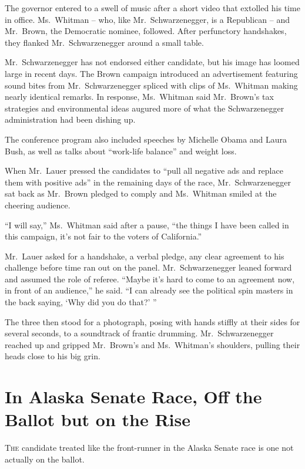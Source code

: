 ﻿\documentclass[12pt]{article}
\begin{document}
The governor entered to a swell of music after a short video that extolled his time in office.
Ms.~Whitman -- who, like Mr.~Schwarzenegger, is a Republican -- and Mr.~Brown, the Democratic
nominee, followed. After perfunctory handshakes, they flanked Mr.~Schwarzenegger around a small
table.

Mr.~Schwarzenegger has not endorsed either candidate, but his image has loomed large in recent days.
The Brown campaign introduced an advertisement featuring sound bites from Mr.~Schwarzenegger spliced
with clips of Ms.~Whitman making nearly identical remarks. In response, Ms.~Whitman said Mr.~Brown's
tax strategies and environmental ideas augured more of what the Schwarzenegger administration had
been dishing up.

The conference program also included speeches by Michelle Obama and Laura Bush, as well as talks
about ``work-life balance'' and weight loss.

When Mr.~Lauer pressed the candidates to ``pull all negative ads and replace them with positive
ads'' in the remaining days of the race, Mr.~Schwarzenegger sat back as Mr.~Brown pledged to comply
and Ms.~Whitman smiled at the cheering audience.

``I will say,'' Ms.~Whitman said after a pause, ``the things I have been called in this campaign,
it's not fair to the voters of California.''

Mr.~Lauer asked for a handshake, a verbal pledge, any clear agreement to his challenge before time
ran out on the panel. Mr.~Schwarzenegger leaned forward and assumed the role of referee. ``Maybe
it's hard to come to an agreement now, in front of an audience,'' he said. ``I can already see the
political spin masters in the back saying, `Why did you do that?' ''

The three then stood for a photograph, posing with hands stiffly at their sides for several seconds,
to a soundtrack of frantic drumming. Mr.~Schwarzenegger reached up and gripped Mr.~Brown's and
Ms.~Whitman's shoulders, pulling their heads close to his big grin.

\section{In Alaska Senate Race, Off the Ballot but on the Rise}

\lettrine{T}{he} candidate treated like the front-runner in the Alaska
Senate race is one not actually on the ballot.
\end{document}
